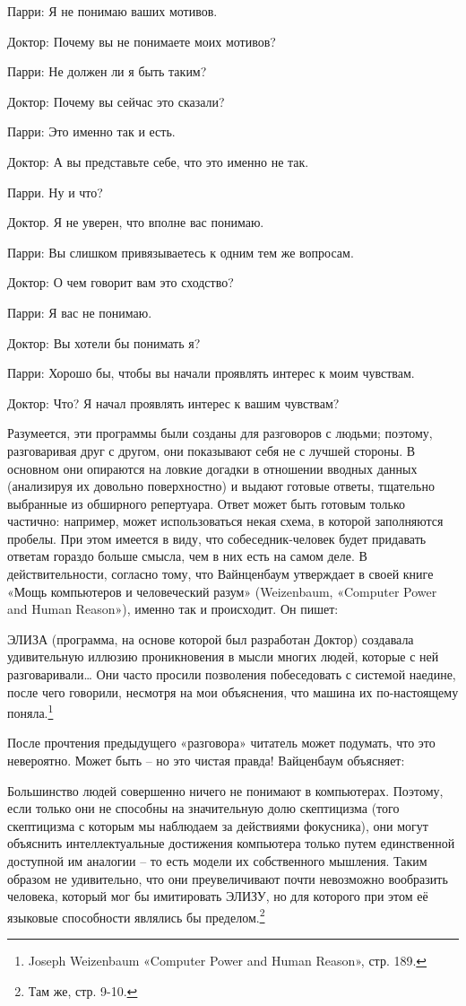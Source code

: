 \documentclass[../main.tex]{subfiles}
\begin{document}
Парри: Я не понимаю ваших мотивов.

Доктор: Почему вы не понимаете моих мотивов?

Парри: Не должен ли я быть таким?

Доктор: Почему вы сейчас это сказали?

Парри: Это именно так и есть.

Доктор: А вы представьте себе, что это именно не так.

Парри. Ну и что?

Доктор. Я не уверен, что вполне вас понимаю.

Парри: Вы слишком привязываетесь к одним тем же вопросам.

Доктор: О чем говорит вам это сходство?

Парри: Я вас не понимаю.

Доктор: Вы хотели бы понимать я?

Парри: Хорошо бы, чтобы вы начали проявлять интерес к моим чувствам.

Доктор: Что? Я начал проявлять интерес к вашим чувствам?

Разумеется, эти программы были созданы для разговоров с людьми; поэтому, разговаривая друг с другом, они показывают себя не с лучшей стороны. В основном они опираются на ловкие догадки в отношении вводных данных (анализируя их довольно поверхностно) и выдают готовые ответы, тщательно выбранные из обширного репертуара. Ответ может быть готовым только частично: например, может использоваться некая схема, в которой заполняются пробелы. При этом имеется в виду, что собеседник-человек будет придавать ответам гораздо больше смысла, чем в них есть на самом деле. В действительности, согласно тому, что Вайнценбаум утверждает в своей книге «Мощь компьютеров и человеческий разум» (Weizenbaum, «Computer Power and Human Reason»), именно так и происходит. Он пишет:

ЭЛИЗА (программа, на основе которой был разработан Доктор) создавала удивительную иллюзию проникновения в мысли многих людей, которые с ней разговаривали\ldots{} Они часто просили позволения побеседовать с системой наедине, после чего говорили, несмотря на мои объяснения, что машина их по-настоящему поняла.\footnote{Joseph Weizenbaum «Computer Power and Human Reason», стр. 189.}

После прочтения предыдущего «разговора» читатель может подумать, что это невероятно. Может быть \--- но это чистая правда! Вайценбаум объясняет:

Большинство людей совершенно ничего не понимают в компьютерах. Поэтому, если только они не способны на значительную долю скептицизма (того скептицизма с которым мы наблюдаем за действиями фокусника), они могут объяснить интеллектуальные достижения компьютера только путем единственной доступной им аналогии \--- то есть модели их собственного мышления. Таким образом не удивительно, что они преувеличивают почти невозможно вообразить человека, который мог бы имитировать ЭЛИЗУ, но для которого при этом её языковые способности являлись бы пределом.\footnote{Там же, стр. 9-10.}
\end{document}
